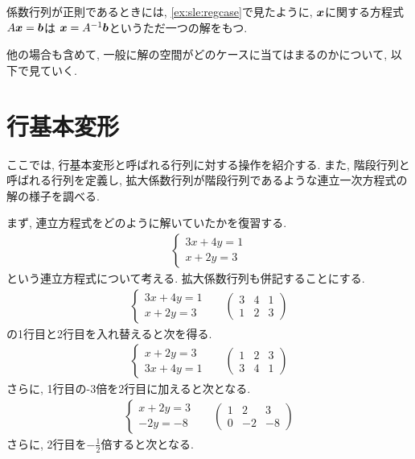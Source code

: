 係数行列が正則であるときには,
\cref{ex:sle:regcase}で見たように,
$\boldsymbol{x}$に関する方程式
$A\boldsymbol{x}=\boldsymbol{b}$は
$\boldsymbol{x}=A^{-1}\boldsymbol{b}$というただ一つの解をもつ.

他の場合も含めて,
一般に解の空間がどのケースに当てはまるのかについて,
以下で見ていく.

\section{行基本変形}
ここでは, 行基本変形と呼ばれる行列に対する操作を紹介する.
また, 階段行列と呼ばれる行列を定義し,
拡大係数行列が階段行列であるような連立一次方程式の解の様子を調べる.

まず, 連立方程式をどのように解いていたかを復習する.
\begin{align*}
  \begin{cases}
    3x+4y=1\\
    x+2y=3
  \end{cases}
\end{align*}
という連立方程式について考える.
拡大係数行列も併記することにする.
\begin{align*}
  \begin{cases}
    3x+4y=1\\
    x+2y=3
  \end{cases}&&
  \begin{pmatrix}
    3&4&1\\
    1&2&3    
  \end{pmatrix}
\end{align*}
の1行目と2行目を入れ替えると次を得る.
\begin{align*}
  \begin{cases}
    x+2y=3\\
    3x+4y=1
  \end{cases}&&
  \begin{pmatrix}
    1&2&3\\    
    3&4&1
  \end{pmatrix}
\end{align*}
さらに,
1行目の-3倍を2行目に加えると次となる.
\begin{align*}
  \begin{cases}
    x+2y=3\\
     -2y=-8
  \end{cases}&&
  \begin{pmatrix}
    1&2&3\\    
    0&-2&-8
  \end{pmatrix}
\end{align*}
さらに,
2行目を$-\frac{1}{2}$倍すると次となる.
